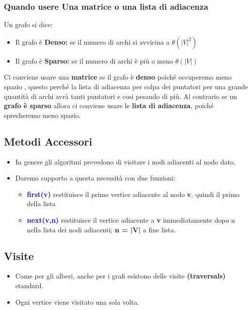 \subsubsection{Quando usere Una matrice o una lista di adiacenza}
Un grafo si dice:
\begin{itemize}
    \item Il grafo è \textbf{Denso:} se il numero di archi si avvicina a $\theta(|V|^2)$
    \item Il grafo è \textbf{Sparso:} se il numero di archi è più o meno $\theta(|V|)$
\end{itemize}
Ci conviene usare una \textbf{matrice} se il grafo è \textbf{denso} poiché occuperemo meno spazio , questo perché la lista di adiacenza per colpa dei puntatori per una grande quantità di archi  avrà tanti puntatori e cosi pesando di più. \newline
Al contrario se un\textbf{ grafo è sparso} allora ci conviene usare le \textbf{lista di adiacenza}, poiché sprecheremo meno spazio.
\subsection{Metodi Accessori}
\begin{itemize}
    \item In genere gli algoritmi prevedono di visitare i nodi adiacenti
    al nodo dato.
    \item Daremo supporto a questa necessità con due funzioni:
    \begin{itemize}
        \item \textbf{\textcolor{blue}{first(v)}} restituisce il primo vertice adiacente al
        nodo \textbf{v}, quindi il primo della lista
        \item \textbf{\textcolor{blue}{next(v,n)}} restituisce il vertice adiacente a \textbf{v}
        immediatamente dopo n nella lista dei nodi
        adiacenti;\textbf{ n = |V|} a fine lista.
    \end{itemize}
\end{itemize}
\begin{tcolorbox}[width=14cm, boxsep=10pt]
    
\end{tcolorbox}
\newpage
\subsection{Visite}
\begin{itemize}
    \item Come per gli alberi, anche per i grafi esistono delle visite
    \textbf{(traversals)} standard.
    \item  Ogni vertice viene visitato una sola volta.
\end{itemize}

